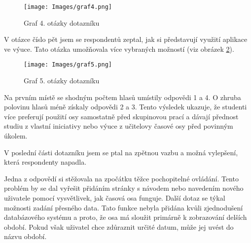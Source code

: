 \begin{figure}[h]
    \centering
    \texttt{[image: Images/graf4.png]}
    \caption{Graf 4. otázky dotazníku}
    \label{fig:graf4}
\end{figure}

V otázce číslo pět jsem se respondentů zeptal, jak si představují využití aplikace ve výuce. Tato otázka umožňovala více vybraných možností (viz obrázek \ref{fig:graf5}).

\begin{figure}[h]
    \centering
    \texttt{[image: Images/graf5.png]}
    \caption{Graf 5. otázky dotazníku}
    \label{fig:graf5}
\end{figure}


Na prvním místě se shodným počtem hlasů umístily odpovědi 1 a 4.
O zhruba polovinu hlasů méně získaly odpovědi 2 a 3.
Tento výsledek ukazuje, že studenti více preferují použití osy samostatně před skupinovou prací a dávají přednost studiu z vlastní iniciativy nebo výuce z učitelovy časové osy před povinným úkolem.

V poslední části dotazníku jsem se ptal na zpětnou vazbu a možná vylepšení, která respondenty napadla.

Jedna z odpovědí si stěžovala na zpočátku těžce pochopitelné ovládání.
Tento problém by se dal vyřešit přidáním stránky s návodem nebo navedením nového uživatele pomocí vysvětlivek, jak časová osa funguje.
Další dotaz se týkal možnosti zadání přesného data. Tato funkce nebyla přidána kvůli zjednodušení databázového systému a proto, že osa má sloužit primárně k zobrazování delších období. Pokud však uživatel chce zdůraznit určité datum, může jej uvést do názvu období.